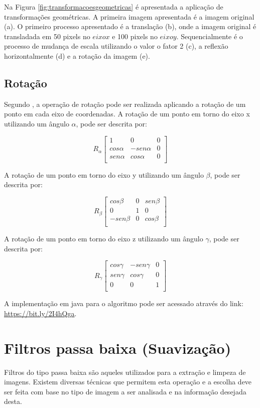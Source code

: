 \documentclass[
	12pt,				%
	oneside,			%
	a4paper,			%
	english,			%
	french,				%
	spanish,			%
	brazil,				%
	]{abntex2}
\begin{document}
Na Figura \ref{fig:transformacoesgeometricas} é apresentada a aplicação de transformações geométricas. A primeira imagem apresentada é a imagem original (a). O primeiro processo apresentado é a translação (b), onde a imagem original é transladada em 50 pixels no \(eixo x\) e 100 pixels no \(eixo y\). Sequencialmente é o processo de mudança de escala utilizando o valor o fator 2 (c), a reflexão horizontalmente (d) e a rotação da imagem (e). 

\subsection{Rotação}

Segundo \citet{pedriniSchwartz:2008}, a operação de rotação pode ser realizada aplicando a rotação de um ponto em cada eixo de coordenadas. A rotação de um ponto em torno do eixo x utilizando um ângulo \(\alpha\), pode ser descrita por:

\[
R_\alpha
\begin{bmatrix}
         1 &          0 & 0   \\ 
 cos\alpha & -sen\alpha & 0   \\ 
 sen\alpha &  cos\alpha & 0   \\ 
\end{bmatrix} 
\]

A rotação de um ponto em torno do eixo y utilizando um ângulo \(\beta\), pode ser descrita por:

\[
R_\beta
\begin{bmatrix}
     cos\beta & 0 & sen\beta  \\ 
	        0 & 1 & 0         \\ 
	-sen\beta & 0 & cos\beta  \\ 
\end{bmatrix} 
\]

A rotação de um ponto em torno do eixo z utilizando um ângulo \(\gamma\), pode ser descrita por:

\[
R_\gamma
\begin{bmatrix}
    cos\gamma & -sen\gamma & 0  \\ 
	sen\gamma &  cos\gamma & 0  \\ 
	        0 &          0 & 1  \\ 
\end{bmatrix} 
\]

A implementação em java para o algoritmo pode ser acessado através do link: \url{https://bit.ly/2I4hQga}.

\section{Filtros passa baixa (Suavização)}
Filtros do tipo passa baixa são aqueles utilizados para a extração e limpeza de imagens. Existem diversas técnicas que permitem esta operação e a escolha deve ser feita com base no tipo de imagem a ser analisada e na informação desejada desta. 
\end{document}
